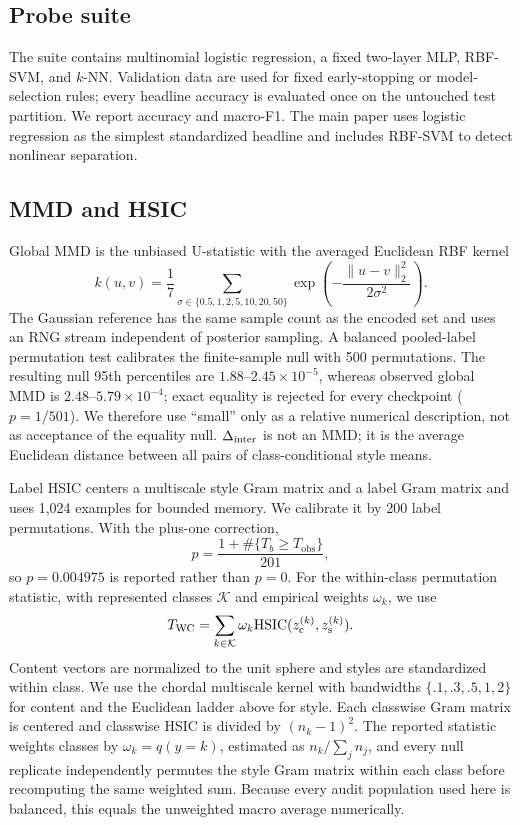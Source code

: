 \subsection{Probe suite}

The suite contains multinomial logistic regression, a fixed two-layer MLP,
RBF-SVM, and $k$-NN.  Validation data are used for fixed early-stopping or
model-selection rules; every headline accuracy is evaluated once on the
untouched test partition.  We report accuracy and macro-F1.  The main paper
uses logistic regression as the simplest standardized headline and includes
RBF-SVM to detect nonlinear separation.

\subsection{MMD and HSIC}

Global MMD is the unbiased U-statistic with the averaged Euclidean RBF kernel
\begin{equation}
k(u,v)=\frac17\sum_{\sigma\in\{0.5,1,2,5,10,20,50\}}
\exp\!\left(-\frac{\|u-v\|_2^2}{2\sigma^2}\right).
\end{equation}
The Gaussian reference has the same sample count as the encoded set and uses
an RNG stream independent of posterior sampling.  A balanced pooled-label
permutation test calibrates the finite-sample null with 500 permutations.
The resulting null 95th percentiles are $1.88$--$2.45\times10^{-5}$, whereas
observed global MMD is $2.48$--$5.79\times10^{-4}$; exact equality is rejected
for every checkpoint ($p=1/501$).  We therefore use ``small'' only as a
relative numerical description, not as acceptance of the equality null.
$\Delta_{\mathrm{inter}}$ is not an MMD; it is the average Euclidean distance between all
pairs of class-conditional style means.

Label HSIC centers a multiscale style Gram matrix and a label Gram matrix and uses
1,024 examples for bounded memory.  We calibrate it by 200 label
permutations.  With the plus-one correction,
\begin{equation}
p=\frac{1+\#\{T_b\ge T_{\mathrm{obs}}\}}{201},
\end{equation}
so $p=0.004975$ is reported rather than $p=0$.  For the within-class
permutation statistic, with represented classes $\mathcal K$ and empirical
weights $\omega_k$, we use
\begin{equation}
T_{\mathrm{WC}}=\sum_{k\in\mathcal K}\omega_k
\mathrm{HSIC}(z_{\mathrm{c}}^{(k)},z_{\mathrm{s}}^{(k)}).
\label{eq:within-class-hsic}
\end{equation}
Content vectors are
normalized to the unit sphere and styles are standardized within class.
We use the chordal multiscale kernel with bandwidths
$\{.1,.3,.5,1,2\}$ for content and the Euclidean ladder above for style.
Each classwise Gram matrix is centered and classwise HSIC is divided by
$(n_k-1)^2$.  The reported statistic weights classes by
$\omega_k=q(y=k)$, estimated as $n_k/\sum_j n_j$, and every null replicate
independently permutes the style Gram matrix within each class before
recomputing the same weighted sum.  Because every audit population used here
is balanced, this equals the unweighted macro average numerically.

